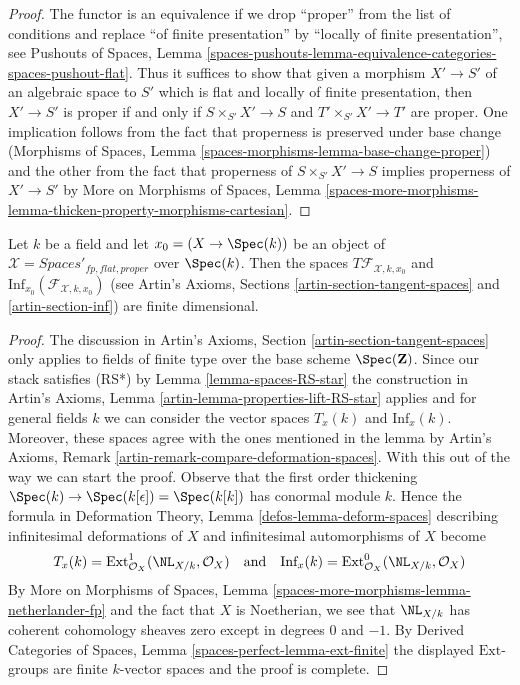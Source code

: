 \begin{proof}
The functor is an equivalence if we drop ``proper'' from the list
of conditions and replace ``of finite presentation'' by
``locally of finite presentation'', see Pushouts of Spaces, Lemma
\ref{spaces-pushouts-lemma-equivalence-categories-spaces-pushout-flat}.
Thus it suffices to show that given a morphism
$X' \to S'$ of an algebraic space to $S'$ which is
flat and locally of finite presentation, then
$X' \to S'$ is proper if and only if $S \times_{S'} X' \to S$
and $T' \times_{S'} X' \to T'$ are proper.
One implication follows from the fact that
properness is preserved under base change
(Morphisms of Spaces, Lemma \ref{spaces-morphisms-lemma-base-change-proper})
and the other from the fact that properness of $S \times_{S'} X' \to S$
implies properness of $X' \to S'$ by
More on Morphisms of Spaces, Lemma
\ref{spaces-more-morphisms-lemma-thicken-property-morphisms-cartesian}.
\end{proof}

\begin{lemma}
\label{lemma-spaces-tangent-space}
Let $k$ be a field and let $x_0 = (X \to \Spec(k))$ be an object of
$\mathcal{X} = \textit{Spaces}'_{fp, flat, proper}$ over $\Spec(k)$.
Then the spaces $T\mathcal{F}_{\mathcal{X}, k, x_0}$ and
$\text{Inf}_{x_0}(\mathcal{F}_{\mathcal{X}, k, x_0})$
(see Artin's Axioms, Sections
\ref{artin-section-tangent-spaces} and
\ref{artin-section-inf})
are finite dimensional.
\end{lemma}

\begin{proof}
The discussion in Artin's Axioms, Section \ref{artin-section-tangent-spaces}
only applies to fields of finite type over the base scheme $\Spec(\mathbf{Z})$.
Since our stack satisfies (RS*) by Lemma \ref{lemma-spaces-RS-star}
the construction in
Artin's Axioms, Lemma \ref{artin-lemma-properties-lift-RS-star}
applies and for general fields $k$ we can consider the vector spaces
$T_x(k)$ and $\text{Inf}_x(k)$. Moreover, these spaces agree with the
ones mentioned in the lemma
by Artin's Axioms, Remark \ref{artin-remark-compare-deformation-spaces}.
With this out of the way we can start the proof.
Observe that the first order thickening
$\Spec(k) \to \Spec(k[\epsilon]) = \Spec(k[k])$
has conormal module $k$. Hence the formula in
Deformation Theory, Lemma \ref{defos-lemma-deform-spaces}
describing infinitesimal deformations of $X$ and infinitesimal
automorphisms of $X$ become
$$
T_x(k) = \text{Ext}^1_{\mathcal{O}_X}(\NL_{X/k}, \mathcal{O}_X)
\quad\text{and}\quad
\text{Inf}_x(k) = \text{Ext}^0_{\mathcal{O}_X}(\NL_{X/k}, \mathcal{O}_X)
$$
By More on Morphisms of Spaces, Lemma
\ref{spaces-more-morphisms-lemma-netherlander-fp}
and the fact that $X$ is Noetherian, we see that
$\NL_{X/k}$ has coherent cohomology sheaves zero except
in degrees $0$ and $-1$.
By Derived Categories of Spaces, Lemma \ref{spaces-perfect-lemma-ext-finite}
the displayed $\text{Ext}$-groups are finite $k$-vector spaces
and the proof is complete.
\end{proof}

